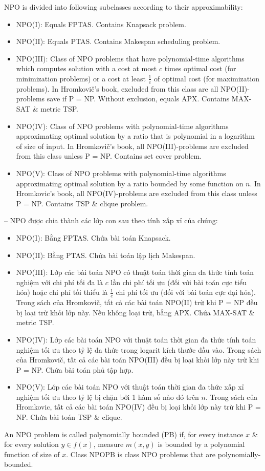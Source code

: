 \documentclass{article}
\begin{document}
NPO is divided into following subclasses according to their approximability:
\begin{itemize}
    \item NPO(I): Equals FPTAS. Contains Knapsack problem.
    \item NPO(II): Equals PTAS. Contains Makespan scheduling problem.
    \item NPO(III): Class of NPO problems that have polynomial-time algorithms which computes solution with a cost at most $c$ times optimal cost (for minimization problems) or a cost at least $\frac{1}{c}$ of optimal cost (for maximization problems). In Hromkovič's book, excluded from this class are all NPO(II)-problems save if P = NP. Without exclusion, equals APX. Contains MAX-SAT \& metric TSP.
    \item NPO(IV): Class of NPO problems with polynomial-time algorithms approximating optimal solution by a ratio that is polynomial in a logarithm of size of input. In Hromkovič's book, all NPO(III)-problems are excluded from this class unless P = NP. Contains set cover problem.
    \item NPO(V): Class of NPO problems with polynomial-time algorithms approximating optimal solution by a ratio bounded by some function on $n$. In Hromkovic's book, all NPO(IV)-problems are excluded from this class unless P = NP. Contains TSP \& clique problem.
\end{itemize}
-- NPO được chia thành các lớp con sau theo tính xấp xỉ của chúng:
\begin{itemize}
    \item NPO(I): Bằng FPTAS. Chứa bài toán Knapsack.
    \item NPO(II): Bằng PTAS. Chứa bài toán lập lịch Makespan.
    \item NPO(III): Lớp các bài toán NPO có thuật toán thời gian đa thức tính toán nghiệm với chi phí tối đa là $c$ lần chi phí tối ưu (đối với bài toán cực tiểu hóa) hoặc chi phí tối thiểu là $\frac{1}{c}$ chi phí tối ưu (đối với bài toán cực đại hóa). Trong sách của Hromkovič, tất cả các bài toán NPO(II) trừ khi P = NP đều bị loại trừ khỏi lớp này. Nếu không loại trừ, bằng APX. Chứa MAX-SAT \& metric TSP.
    \item NPO(IV): Lớp các bài toán NPO với thuật toán thời gian đa thức tính toán nghiệm tối ưu theo tỷ lệ đa thức trong logarit kích thước đầu vào. Trong sách của Hromkovič, tất cả các bài toán NPO(III) đều bị loại khỏi lớp này trừ khi P = NP. Chứa bài toán phủ tập hợp.
    \item NPO(V): Lớp các bài toán NPO với thuật toán thời gian đa thức xấp xỉ nghiệm tối ưu theo tỷ lệ bị chặn bởi 1 hàm số nào đó trên $n$. Trong sách của Hromkovic, tất cả các bài toán NPO(IV) đều bị loại khỏi lớp này trừ khi P = NP. Chứa bài toán TSP \& clique.
\end{itemize}
An NPO problem is called polynomially bounded (PB) if, for every instance $x$ \& for every solution $y\in f(x)$, measure $m(x,y)$ is bounded by a polynomial function of size of $x$. Class NPOPB is class NPO problems that are polynomially-bounded.
\end{document}
